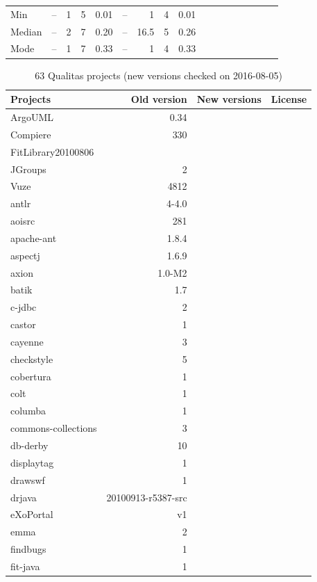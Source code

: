 \documentclass{IEEEtran}
\begin{document}
\begin{table}[h]
{\begin{tabular}{l|r|r|r|r|r|r|r|r|r|r|r|r|r|r|r|r}
			Min 	& -- 	& 1 	& 5 	& 0.01 	& -- 	& 1 		& 4 	& 0.01 \\ %
			Median 	& -- 	& 2 	& 7 	& 0.20 	& -- 	& 16.5 		& 5 	& 0.26 \\ %
			Mode 	& -- 	& 1 	& 7 	& 0.33 	& -- 	& 1 		& 4 	& 0.33 \\ %
			\hline
		\end{tabular} %
	}
\end{table}

\begin{table}[h]
	\centering
	\caption{63 Qualitas projects (new versions checked on 2016-08-05)}
	\label{t:new_and_old}
\begin{tabular}{l|r|r|l}
	\hline 
	Projects & Old version & New versions & License \\
	\hline
	ArgoUML & 0.34 & \\
	Compiere & 330 & \\
	FitLibrary20100806 & & \\
	JGroups & 2 & \\
	Vuze & 4812 & \\
	antlr & 4-4.0 & \\
	aoisrc & 281 & \\
	apache-ant & 1.8.4 & \\
	aspectj & 1.6.9 & \\
	axion & 1.0-M2 & \\
	batik & 1.7 & \\
	c-jdbc & 2 & \\
	castor & 1 & \\
	cayenne & 3 & \\
	checkstyle & 5 & \\
	cobertura & 1 & \\
	colt & 1 & \\
	columba & 1 & \\
	commons-collections & 3 & \\
	db-derby & 10 & \\
	displaytag & 1 & \\
	drawswf & 1 & \\
	drjava & 20100913-r5387-src & \\
	eXoPortal & v1 & \\
	emma & 2 & \\
	findbugs & 1 & \\
	fit-java & 1 & \\

\end{tabular}
\end{table}
\end{document}
